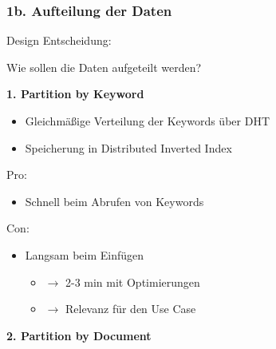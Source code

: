 \documentclass{beamer}
\begin{document}
\begin{frame}[allowframebreaks]
  \frametitle{1b. Aufteilung der Daten}

  Design Entscheidung:

  Wie sollen die Daten aufgeteilt werden?

  \break





  \textbf{1. Partition by Keyword}

  \begin{itemize}
    \item Gleichmäßige Verteilung der Keywords über DHT
    \item Speicherung in Distributed Inverted Index
  \end{itemize}

  \bigskip

  Pro:
  \begin{itemize}
    \item Schnell beim Abrufen von Keywords
  \end{itemize}

  Con:
  \begin{itemize}
    \item Langsam beim Einfügen
      \begin{itemize}
        \item $\rightarrow$ 2-3 min mit Optimierungen
        \item $\rightarrow$ Relevanz für den Use Case
      \end{itemize}
  \end{itemize}

  \break

  \textbf{2. Partition by Document}


\end{frame}
\end{document}
